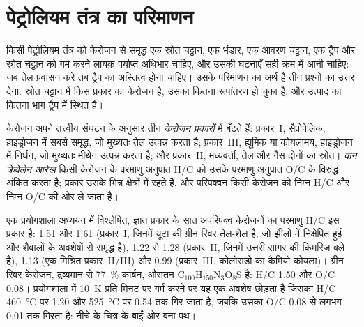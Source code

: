 \section{पेट्रोलियम तंत्र का परिमाणन}\label{sec:b2:energy-geology:petroleum}

किसी पेट्रोलियम तंत्र को केरोजन से समृद्ध एक स्रोत चट्टान, एक भंडार, एक आवरण चट्टान, एक ट्रैप और स्रोत
चट्टान को गर्म करने लायक़ पर्याप्त अधिभार चाहिए, और उसकी घटनाएँ सही क्रम में आनी चाहिए: जब तेल प्रवासन करे
तब ट्रैप का अस्तित्व होना चाहिए। उसके परिमाणन का अर्थ है तीन प्रश्नों का उत्तर देना: स्रोत चट्टान में किस प्रकार
का केरोजन है, उसका कितना रूपांतरण हो चुका है, और उत्पाद का कितना भाग ट्रैप में
स्थित है।

\begin{definition}[केरोजन प्रकार, वान क्रेवेलेन आरेख]\label{def:b2:energy-geology:kerogen}
केरोजन अपने तत्त्वीय संघटन के अनुसार तीन \emph{केरोजन प्रकारों} में बँटते हैं:
प्रकार~I, सैप्रोपेलिक, हाइड्रोजन में सबसे समृद्ध, जो मुख्यतः तेल उत्पन्न करता है; प्रकार~III, ह्यूमिक या कोयलामय,
हाइड्रोजन में निर्धन, जो मुख्यतः मीथेन उत्पन्न करता है; और प्रकार~II, मध्यवर्ती, तेल और गैस दोनों का
स्रोत। \emph{वान क्रेवेलेन आरेख} किसी केरोजन के परमाणु अनुपात H/C को
उसके परमाणु अनुपात O/C के विरुद्ध अंकित करता है; प्रकार उसके भिन्न क्षेत्रों में रहते हैं, और परिपक्वन
किसी केरोजन को निम्न H/C और निम्न O/C की ओर ले जाता है।
\end{definition}

एक प्रयोगशाला अध्ययन में विश्लेषित, ज्ञात प्रकार के सात अपरिपक्व केरोजनों का परमाणु H/C इस प्रकार है:
1.51 और 1.61 (प्रकार~I, जिनमें यूटा की ग्रीन रिवर तेल-शेल है, जो झीलों में निक्षेपित हुई और शैवालों के
अवशेषों से समृद्ध है), 1.22 से 1.28 (प्रकार~II, जिनमें उत्तरी सागर की किमरिज क्ले है),
1.13 (एक मिश्रित प्रकार~II/III) और 0.99 (प्रकार~III, कोलोराडो का कैमियो कोयला)। ग्रीन रिवर
केरोजन, द्रव्यमान से \qty{77}{\percent} कार्बन, औसतन C$_{100}$H$_{150}$N$_3$O$_8$S है: H/C 1.50 और
O/C 0.08। प्रयोगशाला में \qty{10}{K} प्रति मिनट पर गर्म करने पर यह एक अवशेष छोड़ता है जिसका H/C
\qty{460}{\celsius} पर 1.20 और \qty{525}{\celsius} पर 0.54 तक गिर जाता है, जबकि उसका O/C 0.08 से लगभग
0.01 तक गिरता है: नीचे के चित्र के बाईं ओर बना पथ।

